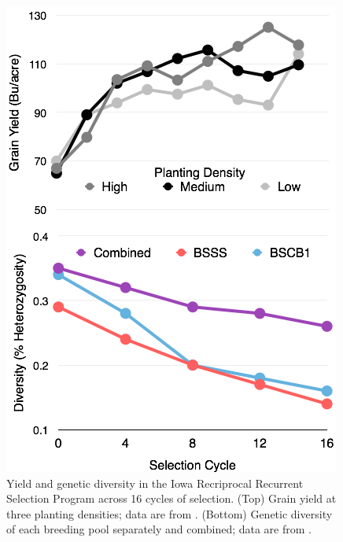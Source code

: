 \documentclass[12pt]{article}
\begin{document}
\begin{figure}
\begin{minipage}[t]{0.5\textwidth}
\includegraphics[width=\textwidth]{BSSS.png}
\caption{Yield and genetic diversity in the Iowa Recriprocal Recurrent Selection Program across 16 cycles of selection. (Top) Grain yield at three planting densities; data are from \citet{rouse2003selection}. (Bottom) Genetic diversity of each breeding pool separately and combined; data are from \citet{Gerke:2013tw}.} 
\label{fig:trends}
\end{minipage}
\end{figure}
\end{document}
